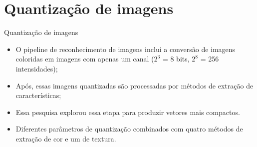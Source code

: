 \documentclass{beamer}
\begin{document}
\section{Quantização de imagens}
\begin{frame}{Quantização de imagens}
\setlength\leftmargini{1em}
\begin{block}{}
\justifying
  \begin{itemize}
  \item O pipeline de reconhecimento de imagens inclui a conversão de imagens coloridas em imagens com apenas um canal ($2^3$ = 8 bits, $2^8$ = 256 intensidades);
  \item Após, essas imagens quantizadas são processadas por métodos de extração de características;
  \item Essa pesquisa explorou essa etapa para produzir vetores mais compactos.
  \item Diferentes parâmetros de quantização combinados com quatro métodos de extração de cor e um de textura.
  \end{itemize}
\end{block}
\end{frame}
\end{document}
